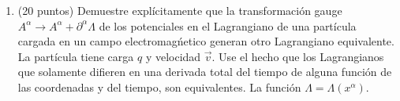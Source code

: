 \documentclass[letterpaper,10pt,onecolumn]{article}
\begin{document}
\begin{enumerate}
\item (20 puntos) Demuestre expl\'icitamente que la transformaci\'on
  gauge $A^{\alpha}\rightarrow A^{\alpha}+\partial^\alpha \Lambda$ de
  los potenciales en el Lagrangiano de una part\'icula cargada en un
  campo electromag\'netico generan
  otro Lagrangiano equivalente. La part\'icula tiene carga $q$ y
  velocidad $\vec{v}$. Use el hecho que los Lagrangianos que solamente
  difieren en una derivada total del tiempo de alguna funci\'on de las
  coordenadas y del tiempo, son equivalentes. La funci\'on $\Lambda =
  \Lambda (x^\alpha)$.

\end{enumerate}
\end{document}
